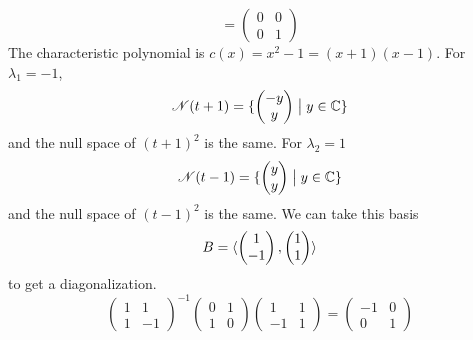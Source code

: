 \begin{exercises}
\begin{answer}
\begin{exparts}
\begin{equation*}
            =
            \begin{pmatrix}
              0  &0  \\
              0  &1
            \end{pmatrix}
          \end{equation*}
        \partsitem The characteristic polynomial is 
          \( c(x)=x^2-1=(x+1)(x-1) \).
          For $\lambda_1=-1$,
          \begin{equation*}
            \mathscr{N}(t+1)=\mbox{$\{\begin{pmatrix} -y \\ y \end{pmatrix}
                                    \bigm| y\in\mathbb{C} \}$} 
          \end{equation*}
          and the null space of $(t+1)^2$ is the same.
          For $\lambda_2=1$ 
          \begin{equation*}
            \mathscr{N}(t-1)=\mbox{$\{\begin{pmatrix} y \\ y \end{pmatrix}
                                    \bigm| y\in\mathbb{C} \}$} 
          \end{equation*}
          and the null space of $(t-1)^2$ is the same.
          We can take this basis
          \begin{equation*}
            B=\langle\begin{pmatrix} 1 \\ -1 \end{pmatrix},\begin{pmatrix} 1 \\ 1 \end{pmatrix}\rangle
          \end{equation*}
          to get a diagonalization.
          \begin{equation*}
            \begin{pmatrix}
              1  &1  \\
              1  &-1
            \end{pmatrix}^{-1}
            \begin{pmatrix}
              0  &1  \\
              1  &0
            \end{pmatrix}
            \begin{pmatrix}
              1   &1  \\
              -1  &1
            \end{pmatrix}
            =
            \begin{pmatrix}
              -1  &0  \\
              0   &1
            \end{pmatrix}
          \end{equation*}
      \end{exparts}  
     \end{answer}

\end{exercises}
